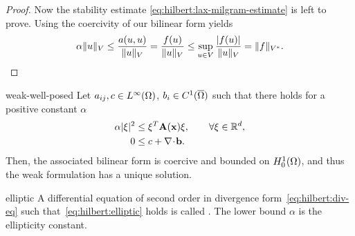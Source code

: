 \begin{proof}
  Now the stability estimate \eqref{eq:hilbert:lax-milgram-estimate} is left to prove.
  Using the coercivity of our bilinear form yields
  \begin{gather*}
    \alpha \lVert u\rVert_V \leq \frac{a(u,u)}{\lVert u\rVert_V} = \frac{f(u)}{\lVert u\rVert_V} \leq \sup_{u\in V} \frac{\lvert f(u)\rvert}{\lVert u\rVert_V} = \lVert f\rVert_{V^*}.
  \end{gather*}
\end{proof}

\begin{Lemma}{weak-well-posed}
  Let $a_{ij}, c\in L^\infty(\Omega)$, $b_i \in C^1(\overline{\Omega})$ such
  that there holds for a positive constant $\alpha$
  \begin{gather}
    \label{eq:hilbert:elliptic}
    \begin{split}
    \alpha\lvert\xi\rvert^2 &\le \xi^T \mathbf A(\mathbf x) \xi,
    \qquad \forall \xi \in \mathbb R^d,
    \\
    0 &\le c + \nabla\!\cdot\! \mathbf b.
    \end{split}
  \end{gather}
  Then, the associated bilinear form is coercive and bounded on
  $H^1_0(\Omega)$, and thus the weak formulation has a unique
  solution.
\end{Lemma}

\begin{Definition}{elliptic}
  A differential equation of second order in divergence
  form~\eqref{eq:hilbert:div-eq} such that~\ref{eq:hilbert:elliptic}
  holds is called . The lower bound $\alpha$ is the
  ellipticity constant.
\end{Definition}

